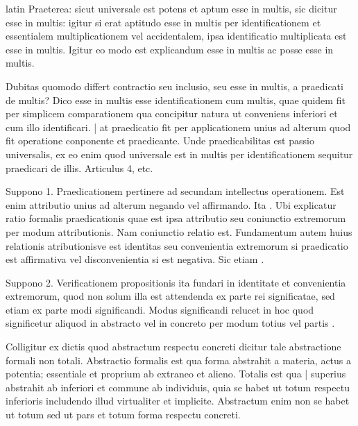 \begin{otherlanguage*}{latin}
\pstart
Praeterea:
sicut universale est potens et aptum esse in multis, sic dicitur esse in multis:
igitur si erat aptitudo esse in multis per  identificationem et essentialem multiplicationem vel accidentalem, ipsa identificatio multiplicata est esse in multis. Igitur eo modo est explicandum esse in multis ac posse esse in multis. 
\pend

\pstart
Dubitas quomodo differt contractio seu inclusio, seu esse in multis, a praedicati de multis? Dico esse in multis esse identificationem cum multis, quae quidem fit per simplicem comparationem qua concipitur natura ut conveniens inferiori et cum illo identificari. \textnormal{|} at praedicatio fit per applicationem unius ad alterum quod fit operatione conponente et praedicante. Unde praedicabilitas est passio universalis, ex eo enim quod universale est in multis per identificationem sequitur praedicari de illis. Articulus 4, etc. 
\pend

\pstart
{}
\pend

\pstart
Suppono 1. Praedicationem pertinere ad secundam intellectus operationem. Est enim attributio unius ad alterum negando vel affirmando. Ita . Ubi explicatur ratio formalis praedicationis quae est ipsa attributio seu coniunctio extremorum per modum attributionis. Nam coniunctio relatio est. Fundamentum autem huius relationis atributionisve est identitas seu convenientia extremorum si praedicatio est affirmativa vel disconvenientia si est negativa. Sic etiam . 
\pend

\pstart
Suppono 2. Verificationem propositionis ita fundari in identitate et convenientia extremorum, quod non solum illa est attendenda ex parte rei significatae, sed etiam ex parte modi significandi. Modus significandi relucet in hoc quod significetur aliquod in abstracto vel in concreto per modum totius vel partis . 
\pend

\pstart
Colligitur ex dictis quod abstractum respectu concreti dicitur tale abstractione formali non totali. Abstractio formalis est qua forma abstrahit a materia, actus a potentia; essentiale et proprium ab extraneo et alieno. Totalis est qua \textnormal{|} superius abstrahit ab inferiori et commune ab individuis, quia se habet ut totum respectu inferioris includendo illud virtualiter et implicite. Abstractum enim non se habet ut totum sed ut pars et totum forma respectu concreti. 
\pend


\end{otherlanguage*}
